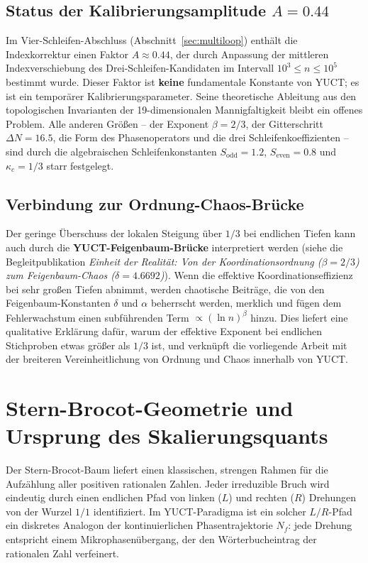 \documentclass[11pt,a4paper]{article}
\begin{document}
	\subsection{Status der Kalibrierungsamplitude \(A=0.44\)}
	Im Vier-Schleifen-Abschluss (Abschnitt~\ref{sec:multiloop}) enthält die Indexkorrektur einen Faktor \(A \approx 0.44\), der durch Anpassung der mittleren Indexverschiebung des Drei-Schleifen-Kandidaten im Intervall \(10^3\le n\le 10^5\) bestimmt wurde. Dieser Faktor ist \textbf{keine} fundamentale Konstante von YUCT; es ist ein temporärer Kalibrierungsparameter. Seine theoretische Ableitung aus den topologischen Invarianten der 19-dimensionalen Mannigfaltigkeit bleibt ein offenes Problem. Alle anderen Größen – der Exponent \(\beta=2/3\), der Gitterschritt \(\Delta N=16.5\), die Form des Phasenoperators und die drei Schleifenkoeffizienten – sind durch die algebraischen Schleifenkonstanten \(S_{\mathrm{odd}}=1.2\), \(S_{\mathrm{even}}=0.8\) und \(\kappa_c=1/3\) starr festgelegt.
	
	\subsection{Verbindung zur Ordnung-Chaos-Brücke}
	Der geringe Überschuss der lokalen Steigung über \(1/3\) bei endlichen Tiefen kann auch durch die \textbf{YUCT-Feigenbaum-Brücke} interpretiert werden (siehe die Begleitpublikation \emph{Einheit der Realität: Von der Koordinationsordnung (\(\beta=2/3\)) zum Feigenbaum-Chaos (\(\delta=4.6692\))}). Wenn die effektive Koordinationseffizienz bei sehr großen Tiefen abnimmt, werden chaotische Beiträge, die von den Feigenbaum-Konstanten \(\delta\) und \(\alpha\) beherrscht werden, merklich und fügen dem Fehlerwachstum einen subführenden Term \(\propto (\ln n)^{\beta}\) hinzu. Dies liefert eine qualitative Erklärung dafür, warum der effektive Exponent bei endlichen Stichproben etwas größer als \(1/3\) ist, und verknüpft die vorliegende Arbeit mit der breiteren Vereinheitlichung von Ordnung und Chaos innerhalb von YUCT.
	
	\section{Stern-Brocot-Geometrie und Ursprung des Skalierungsquants}
	\label{sec:stern-brocot}
	
	Der Stern-Brocot-Baum liefert einen klassischen, strengen Rahmen für die Aufzählung aller positiven rationalen Zahlen. Jeder irreduzible Bruch wird eindeutig durch einen endlichen Pfad von linken (\(L\)) und rechten (\(R\)) Drehungen von der Wurzel \(1/1\) identifiziert. Im YUCT-Paradigma ist ein solcher \(L/R\)-Pfad ein diskretes Analogon der kontinuierlichen Phasentrajektorie \(N_f\): jede Drehung entspricht einem Mikrophasenübergang, der den Wörterbucheintrag der rationalen Zahl verfeinert.
	
\end{document}
